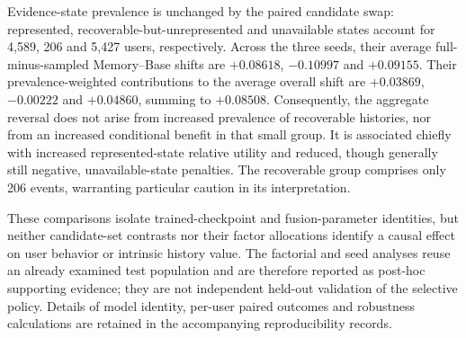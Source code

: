 Evidence-state prevalence is unchanged by the paired candidate swap: represented, recoverable-but-unrepresented and unavailable states account for 4,589, 206 and 5,427 users, respectively. Across the three seeds, their average full-minus-sampled Memory--Base shifts are $+0.08618$, $-0.10997$ and $+0.09155$. Their prevalence-weighted contributions to the average overall shift are $+0.03869$, $-0.00222$ and $+0.04860$, summing to $+0.08508$. Consequently, the aggregate reversal does not arise from increased prevalence of recoverable histories, nor from an increased conditional benefit in that small group. It is associated chiefly with increased represented-state relative utility and reduced, though generally still negative, unavailable-state penalties. The recoverable group comprises only 206 events, warranting particular caution in its interpretation.

These comparisons isolate trained-checkpoint and fusion-parameter identities, but neither candidate-set contrasts nor their factor allocations identify a causal effect on user behavior or intrinsic history value. The factorial and seed analyses reuse an already examined test population and are therefore reported as post-hoc supporting evidence; they are not independent held-out validation of the selective policy. Details of model identity, per-user paired outcomes and robustness calculations are retained in the accompanying reproducibility records.

